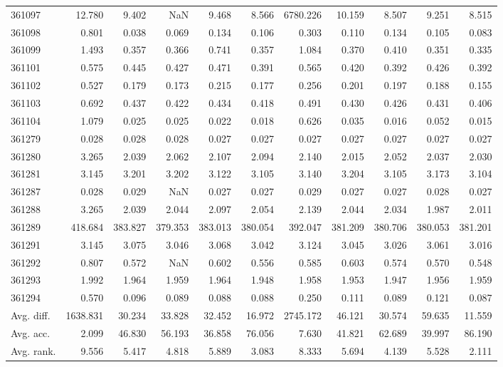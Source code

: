 \begin{tabular}{lrrrrrrrrrr}
361097 & 12.780 & 9.402 & NaN & 9.468 & 8.566 & 6780.226 & 10.159 & 8.507 & 9.251 & 8.515 \\
361098 & 0.801 & 0.038 & 0.069 & 0.134 & 0.106 & 0.303 & 0.110 & 0.134 & 0.105 & 0.083 \\
361099 & 1.493 & 0.357 & 0.366 & 0.741 & 0.357 & 1.084 & 0.370 & 0.410 & 0.351 & 0.335 \\
361101 & 0.575 & 0.445 & 0.427 & 0.471 & 0.391 & 0.565 & 0.420 & 0.392 & 0.426 & 0.392 \\
361102 & 0.527 & 0.179 & 0.173 & 0.215 & 0.177 & 0.256 & 0.201 & 0.197 & 0.188 & 0.155 \\
361103 & 0.692 & 0.437 & 0.422 & 0.434 & 0.418 & 0.491 & 0.430 & 0.426 & 0.431 & 0.406 \\
361104 & 1.079 & 0.025 & 0.025 & 0.022 & 0.018 & 0.626 & 0.035 & 0.016 & 0.052 & 0.015 \\
361279 & 0.028 & 0.028 & 0.028 & 0.027 & 0.027 & 0.027 & 0.027 & 0.027 & 0.027 & 0.027 \\
361280 & 3.265 & 2.039 & 2.062 & 2.107 & 2.094 & 2.140 & 2.015 & 2.052 & 2.037 & 2.030 \\
361281 & 3.145 & 3.201 & 3.202 & 3.122 & 3.105 & 3.140 & 3.204 & 3.105 & 3.173 & 3.104 \\
361287 & 0.028 & 0.029 & NaN & 0.027 & 0.027 & 0.029 & 0.027 & 0.027 & 0.028 & 0.027 \\
361288 & 3.265 & 2.039 & 2.044 & 2.097 & 2.054 & 2.139 & 2.044 & 2.034 & 1.987 & 2.011 \\
361289 & 418.684 & 383.827 & 379.353 & 383.013 & 380.054 & 392.047 & 381.209 & 380.706 & 380.053 & 381.201 \\
361291 & 3.145 & 3.075 & 3.046 & 3.068 & 3.042 & 3.124 & 3.045 & 3.026 & 3.061 & 3.016 \\
361292 & 0.807 & 0.572 & NaN & 0.602 & 0.556 & 0.585 & 0.603 & 0.574 & 0.570 & 0.548 \\
361293 & 1.992 & 1.964 & 1.959 & 1.964 & 1.948 & 1.958 & 1.953 & 1.947 & 1.956 & 1.959 \\
361294 & 0.570 & 0.096 & 0.089 & 0.088 & 0.088 & 0.250 & 0.111 & 0.089 & 0.121 & 0.087 \\
Avg. diff. & 1638.831 & 30.234 & 33.828 & 32.452 & 16.972 & 2745.172 & 46.121 & 30.574 & 59.635 & 11.559 \\
Avg. acc. & 2.099 & 46.830 & 56.193 & 36.858 & 76.056 & 7.630 & 41.821 & 62.689 & 39.997 & 86.190 \\
Avg. rank. & 9.556 & 5.417 & 4.818 & 5.889 & 3.083 & 8.333 & 5.694 & 4.139 & 5.528 & 2.111 \\
\bottomrule
\end{tabular}
